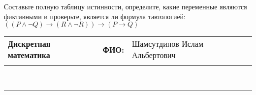 \documentclass[10pt]{exam}
\newcommand{\class}{Дискретная математика}
\newcommand{\examdate}{}
\begin{document}
\begin{questions}
\begin{enumerate}[a)]
\end{enumerate}\question Составьте полную таблицу истинности, определите, какие переменные являются фиктивными и проверьте, является ли формула тавтологией:
$(( P \land \neg Q) \rightarrow (R \land \neg R)) \rightarrow (P \rightarrow Q)$

\end{questions}
\newpage
\begin{flushright}
\begin{tabular}{p{2.8in} r l}
\textbf{\class} & \textbf{ФИО:} &Шамсутдинов Ислам Альбертович
\\

\textbf{\examdate} &&\\
\end{tabular}\\
\end{flushright}
\rule[1ex]{\textwidth}{.1pt}
\end{document}
